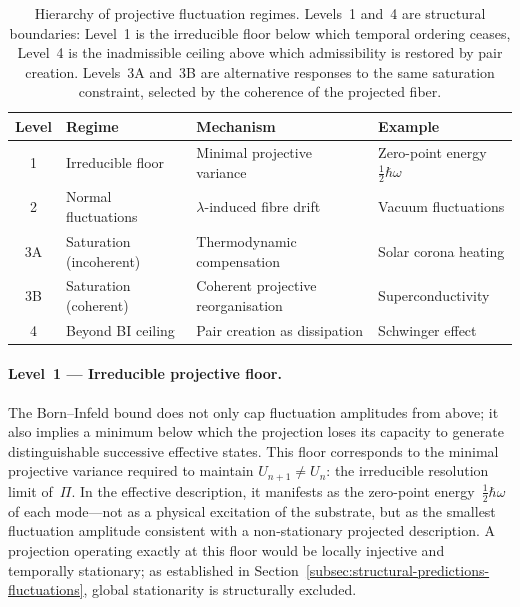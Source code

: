   \begin{table}[ht]
    \centering
    \begin{tabular}{clll}
      \hline
      \textbf{Level} & \textbf{Regime}         & \textbf{Mechanism}                 & \textbf{Example}
      \\
      \hline
      1              & Irreducible floor       & Minimal projective variance        & Zero-point energy
      $\tfrac{1}{2}\hbar\omega$ \\
      2              & Normal fluctuations     & $\lambda$-induced fibre drift      & Vacuum fluctuations
      \\
      3A             & Saturation (incoherent) & Thermodynamic compensation         & Solar corona heating
      \\
      3B             & Saturation (coherent)   & Coherent projective reorganisation & Superconductivity
      \\
      4              & Beyond BI ceiling       & Pair creation as dissipation       & Schwinger effect
      \\
      \hline
    \end{tabular}
    \caption{Hierarchy of projective fluctuation regimes.
    Levels~1 and~4 are structural boundaries: Level~1 is the irreducible floor below
    which temporal ordering ceases, Level~4 is the inadmissible ceiling above which
    admissibility is restored by pair creation.
    Levels~3A and~3B are alternative responses to the same saturation constraint,
      selected by the coherence of the projected fiber.}
    \label{tab:fluctuation-hierarchy}
  \end{table}

  \paragraph{Level~1 --- Irreducible projective floor.}

    The Born--Infeld bound does not only cap fluctuation amplitudes from above; it also
    implies a minimum below which the projection loses its capacity to generate
    distinguishable successive effective states.
    This floor corresponds to the minimal projective variance required to maintain
    $U_{n+1} \neq U_n$: the irreducible resolution limit of~$\Pi$.
    In the effective description, it manifests as the zero-point energy~$\tfrac{1}{2}\hbar\omega$
    of each mode---not as a physical excitation of the substrate, but as the smallest
    fluctuation amplitude consistent with a non-stationary projected description.
    A projection operating exactly at this floor would be locally injective and temporally
    stationary; as established in Section~\ref{subsec:structural-predictions-fluctuations},
    global stationarity is structurally excluded.

